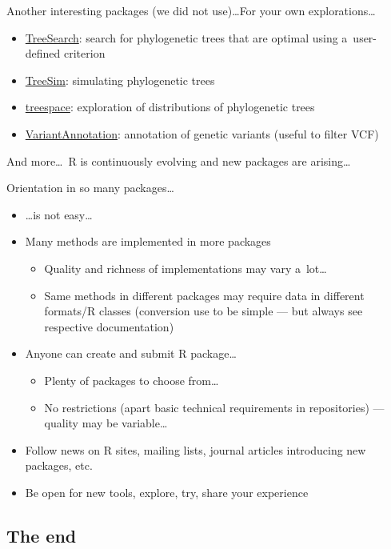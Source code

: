 \documentclass[compress, ucs, xelatex, 11pt, xcolor=svgnames,
  hyperref={
    bookmarks=true,
    unicode=true,
    colorlinks=true,
    pdftitle={Molecular data in R},
    plainpages=false,
    pdfauthor={Vojtech Zeisek},
    pdfsubject={Course about phylogeny and evolution in R},
    pdfcreator={XeLaTeX},
    pdfkeywords={R, evolution, phylogeny, molecular data},
    linkcolor=Tomato,
    anchorcolor=SaddleBrown,
    citecolor=Goldenrod,
    filecolor=DarkMagenta,
    menucolor=Sienna,
    urlcolor=DarkTurquoise,
    pdftex},
  url={hyphens, lowtilde} %
  ]{beamer}
\begin{document}
\begin{frame}[allowframebreaks]{Another interesting packages (we did not use)\ldots}{For your own explorations\ldots}
\begin{itemize}
    \item \href{https://CRAN.R-project.org/package=TreeSearch}{TreeSearch}: search for phylogenetic trees that are optimal using a~user-defined criterion
    \item \href{https://CRAN.R-project.org/package=TreeSim}{TreeSim}: simulating phylogenetic trees
    \item \href{https://CRAN.R-project.org/package=treespace}{treespace}: exploration of distributions of phylogenetic trees
    \item \href{https://bioconductor.org/packages/VariantAnnotation/}{VariantAnnotation}: annotation of genetic variants (useful to filter VCF)
  \end{itemize}
  And more\ldots~R is continuously evolving and new packages are arising\ldots
\end{frame}

\begin{frame}{Orientation in so many packages\ldots}
  \begin{itemize}
    \item \ldots is not easy\ldots
    \item Many methods are implemented in more packages
    \begin{itemize}
      \item Quality and richness of implementations may vary a~lot\ldots
      \item Same methods in different packages may require data in different formats/R classes (conversion use to be simple --- but always see respective documentation)
    \end{itemize}
    \item Anyone can create and submit R package\ldots
    \begin{itemize}
      \item Plenty of packages to choose from\ldots
      \item No restrictions (apart basic technical requirements in repositories) --- quality may be variable\ldots
    \end{itemize}
    \item Follow news on R sites, mailing lists, journal articles introducing new packages, etc.
    \item Be open for new tools, explore, try, share your experience
  \end{itemize}
\end{frame}

\subsection{The end}
\end{document}
